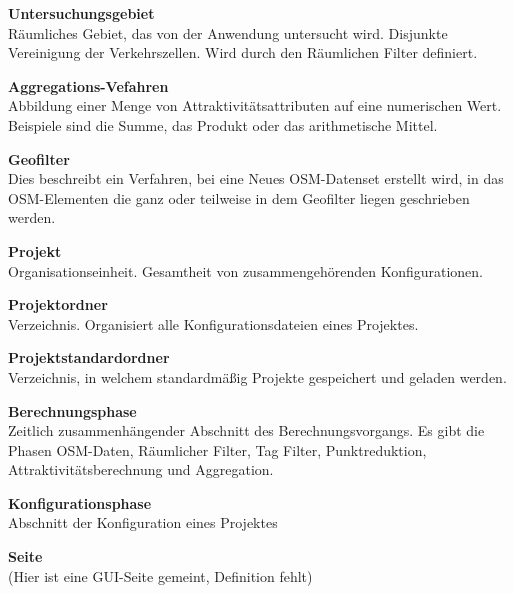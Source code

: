 \documentclass[parskip=full]{scrartcl} %
\begin{document}
\textbf{Untersuchungsgebiet}\\
Räumliches Gebiet, das von der Anwendung untersucht wird. Disjunkte Vereinigung der Verkehrszellen. Wird durch den Räumlichen Filter definiert.

\textbf{Aggregations-Vefahren}\\
Abbildung einer Menge von Attraktivitätsattributen auf eine numerischen Wert. Beispiele sind die Summe, das Produkt oder das arithmetische Mittel.

\textbf{Geofilter}\\
Dies beschreibt ein Verfahren, bei eine Neues OSM-Datenset erstellt wird, in das OSM-Elementen die ganz oder teilweise in dem Geofilter liegen geschrieben werden.

\textbf{Projekt}\\
Organisationseinheit. Gesamtheit von zusammengehörenden Konfigurationen.

\textbf{Projektordner}\\
Verzeichnis. Organisiert alle Konfigurationsdateien eines Projektes.

\textbf{Projektstandardordner}\\
Verzeichnis, in welchem standardmäßig Projekte gespeichert und geladen werden.

\textbf{Berechnungsphase}\\
Zeitlich zusammenhängender Abschnitt des Berechnungsvorgangs. Es gibt die Phasen OSM-Daten, Räumlicher Filter, Tag Filter, Punktreduktion, Attraktivitätsberechnung und Aggregation.

\textbf{Konfigurationsphase}\\
Abschnitt der Konfiguration eines Projektes

\textbf{Seite}\\
(Hier ist eine GUI-Seite gemeint, Definition fehlt)
\end{document}
